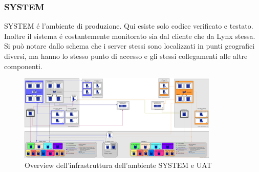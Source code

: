 \subsubsection{SYSTEM}

SYSTEM é l'ambiente di produzione. Qui esiste solo codice verificato e testato. Inoltre il sistema é costantemente monitorato sia dal cliente che da Lynx stessa.  \\
Si può notare dallo schema che i server stessi sono localizzati in punti geografici diversi, ma hanno lo stesso punto di accesso e gli stessi collegamenti alle altre componenti.  

\begin{figure}[h!]
    \centering
	\includegraphics[width=0.85\textwidth]{./res/img/SchemiAmbienti_SYSTEM-UAT_v1.1.png}
    \caption{Overview dell'infrastruttura dell'ambiente SYSTEM e UAT}
\end{figure}

